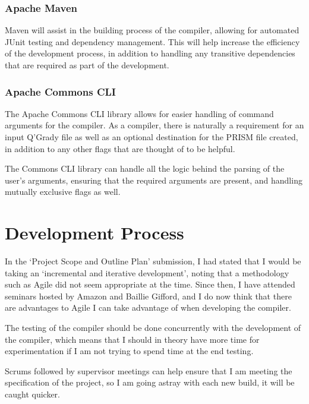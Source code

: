 \documentclass[11pt, a4paper]{article}
\begin{document}
\subsubsection{Apache Maven}
\label{sub:maven}
Maven will assist in the building process of the compiler, allowing for 
automated JUnit testing and dependency management. This will help increase the
efficiency of the development process, in addition to handling any transitive
dependencies that are required as part of the development.

\subsubsection{Apache Commons CLI}
\label{sub:commons_cli}
The Apache Commons CLI library allows for easier handling of command arguments
for the compiler. As a compiler, there is naturally a requirement for an input
Q'Grady file as well as an optional destination for the PRISM file created, in
addition to any other flags that are thought of to be helpful. 

The Commons CLI library can handle all the logic behind the parsing of the
user's arguments, ensuring that the required arguments are present, and handling
mutually exclusive flags as well.


\section{Development Process} %
\label{sec:development_process}
In the `Project Scope and Outline Plan' submission, I had stated that I would
be taking an `incremental and iterative development', noting that a methodology
such as Agile did not seem appropriate at the time. Since then, I have attended
seminars hosted by Amazon and Baillie Gifford, and I do now think that there
are advantages to Agile I can take advantage of when developing the compiler.

The testing of the compiler should be done concurrently with the development of
the compiler, which means that I should in theory have more time for
experimentation if I am not trying to spend time at the end testing.

Scrums followed by supervisor meetings can help ensure that I am meeting the
specification of the project, so I am going astray with each new build, it will
be caught quicker.
\end{document}
